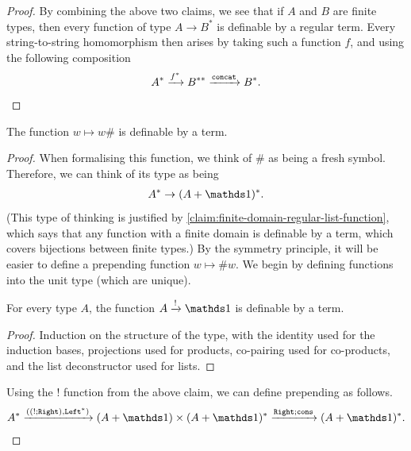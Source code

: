 \begin{proof}
By combining the above two claims, we see that if $A$ and $B$ are finite types, then every function of type $A \to B^*$ is definable by a regular term. Every  string-to-string homomorphism  then arises by taking such a function $f$, and using the following composition
\begin{align*}
    A^* \xrightarrow{f^*} B^{**} \xrightarrow {\mathtt{concat}} B^*.
\end{align*}
\end{proof}

\begin{lemma}\label{lem:terms-define-append-hash}
    The function $w \mapsto w\#$ is definable by a term.
\end{lemma}
\begin{proof}
    When formalising this function, we think of $\#$ as being a fresh symbol. Therefore, we can think of its type as being 
    \begin{align*}
    A^* \to (A + \onetype)^*.
    \end{align*}
    (This type of thinking is justified by \cref{claim:finite-domain-regular-list-function}, which says that any function with a finite domain is definable by a term, which covers bijections between finite types.) By the symmetry principle, it will be easier to define a prepending function $w \mapsto \#w$. We begin by defining functions into the unit type (which are unique).

    \begin{claim}\label{claim:bang-definable}
         For every type $A$, the function  $A \xrightarrow ! \onetype$ is definable by a term. 
    \end{claim}
    \begin{proof}
        Induction on the structure of the type, with the identity used for the induction bases, projections used for products, co-pairing used for co-products, and the list deconstructor used for lists.
    \end{proof}
    Using the $!$ function from the above claim, we can define prepending as follows.
    \begin{align*}
    A^* \xrightarrow {((!;\rightterm),\leftterm^*)}   (A + \onetype) \times (A + \onetype)^* \xrightarrow {\rightterm;\consterm} (A + \onetype)^*.
    \end{align*}
\end{proof}

